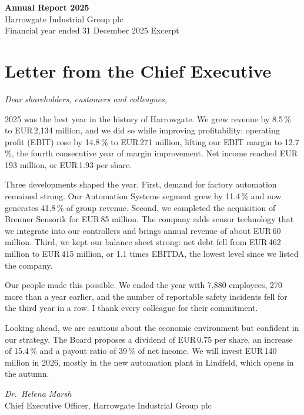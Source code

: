 \documentclass[10.5pt,a4paper]{article}
\newcommand{\eur}{EUR\,}
\begin{document}
\noindent\colorbox{hgreen}{\parbox{\dimexpr\linewidth-2\fboxsep}{\color{white}\sffamily\vspace{0.6em}
{\Huge\bfseries Annual Report 2025}\\[0.3em]
{\Large Harrowgate Industrial Group plc}\\[0.2em]
{\large Financial year ended 31 December 2025 \textperiodcentered{} Excerpt}\vspace{0.6em}}}

\section{Letter from the Chief Executive}
\textit{Dear shareholders, customers and colleagues,}

2025 was the best year in the history of Harrowgate. We grew revenue by 8.5\,\% to \eur 2,134 million, and we
did so while improving profitability: operating profit (EBIT) rose by 14.8\,\% to \eur 271 million, lifting
our EBIT margin to 12.7\,\%, the fourth consecutive year of margin improvement. Net income reached
\eur 193 million, or \eur 1.93 per share.

Three developments shaped the year. First, demand for factory automation remained strong. Our Automation
Systems segment grew by 11.4\,\% and now generates 41.8\,\% of group revenue. Second, we completed the
acquisition of Brenner Sensorik for \eur 85 million. The company adds sensor technology that we integrate into
our controllers and brings annual revenue of about \eur 60 million. Third, we kept our balance sheet strong:
net debt fell from \eur 462 million to \eur 415 million, or 1.1 times EBITDA, the lowest level since we
listed the company.

Our people made this possible. We ended the year with 7,880 employees, 270 more than a year earlier, and
the number of reportable safety incidents fell for the third year in a row. I thank every colleague for
their commitment.

Looking ahead, we are cautious about the economic environment but confident in our strategy. The Board
proposes a dividend of \eur 0.75 per share, an increase of 15.4\,\% and a payout ratio of 39\,\% of net income.
We will invest \eur 140 million in 2026, mostly in the new automation plant in Lindfeld, which opens in the
autumn.

\vspace{0.2em}
\textit{Dr.\ Helena Marsh}\\
Chief Executive Officer, Harrowgate Industrial Group plc
\end{document}

